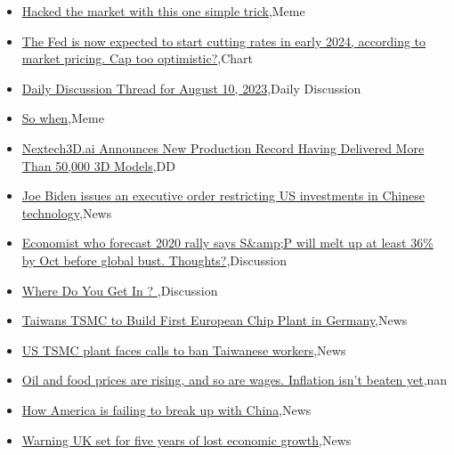\documentclass{article}%
\begin{document}
%
\begin{itemize}%
\item%
\href{https://reddit.com/r/wallstreetbets/comments/15n9snh/hacked\_the\_market\_with\_this\_one\_simple\_trick/}{Hacked the market with this one simple trick},Meme%
\item%
\href{https://reddit.com/r/wallstreetbets/comments/15n9898/the\_fed\_is\_now\_expected\_to\_start\_cutting\_rates\_in/}{The Fed is now expected to start cutting rates in early 2024, according to market pricing. Cap too optimistic?},Chart%
\item%
\href{https://reddit.com/r/wallstreetbets/comments/15n8341/daily\_discussion\_thread\_for\_august\_10\_2023/}{Daily Discussion Thread for August 10, 2023},Daily Discussion%
\item%
\href{https://reddit.com/r/wallstreetbets/comments/15n372v/so\_when/}{So when},Meme%
\item%
\href{https://reddit.com/r/Baystreetbets/comments/15mlmvp/nextech3dai\_announces\_new\_production\_record/}{Nextech3D.ai Announces New Production Record Having Delivered More Than 50,000 3D Models},DD%
\item%
\href{https://reddit.com/r/StockMarket/comments/15mvytx/joe\_biden\_issues\_an\_executive\_order\_restricting/}{Joe Biden issues an executive order restricting US investments in Chinese technology},News%
\item%
\href{https://reddit.com/r/StockMarket/comments/15moysu/economist\_who\_forecast\_2020\_rally\_says\_sp\_will/}{Economist who forecast 2020 rally says S\&amp;P will melt up at least 36\% by Oct before global bust. Thoughts?},Discussion%
\item%
\href{https://reddit.com/r/StockMarket/comments/15mkp6x/where\_do\_you\_get\_in/}{Where Do You Get In ? },Discussion%
\item%
\href{https://reddit.com/r/Economics/comments/15mghhs/taiwans\_tsmc\_to\_build\_first\_european\_chip\_plant/}{Taiwans TSMC to Build First European Chip Plant in Germany},News%
\item%
\href{https://reddit.com/r/Economics/comments/15mcvju/us\_tsmc\_plant\_faces\_calls\_to\_ban\_taiwanese\_workers/}{US TSMC plant faces calls to ban Taiwanese workers},News%
\item%
\href{https://reddit.com/r/Economics/comments/15mcudk/oil\_and\_food\_prices\_are\_rising\_and\_so\_are\_wages/}{Oil and food prices are rising, and so are wages. Inflation isn't beaten yet},nan%
\item%
\href{https://reddit.com/r/Economics/comments/15mbxp2/how\_america\_is\_failing\_to\_break\_up\_with\_china/}{How America is failing to break up with China},News%
\item%
\href{https://reddit.com/r/Economics/comments/15ma3lc/warning\_uk\_set\_for\_five\_years\_of\_lost\_economic/}{Warning UK set for five years of lost economic growth},News%
\end{itemize}%
\end{document}
